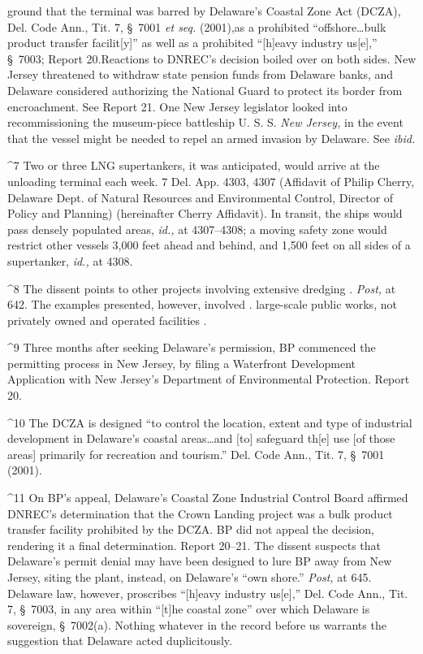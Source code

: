 {ground that the terminal was barred by Delaware's Coastal Zone Act
(DCZA), Del. Code Ann., Tit. 7, \S~7001 \emph{et seq.} (2001),\footnotemark[10] as
a prohibited ``offshore\dots bulk product transfer facilit[y]'' as
well as a prohibited ``[h]eavy industry us[e],'' \S~7003; Report
20.\footnotemark[11] Reactions to DNREC's decision boiled over on both sides.
New Jersey threatened to withdraw state pension funds from Delaware
banks, and Delaware considered authorizing the National Guard to protect
its border from encroachment. \newpage  See Report 21. One New Jersey
legislator looked into recommissioning the museum-piece battleship U. S.
S. \emph{New Jersey,} in the event that the vessel might be needed to repel
an armed invasion by Delaware. See \emph{ibid.}

^7 Two or three LNG supertankers, it was anticipated, would arrive at
the unloading terminal each week. 7 Del. App. 4303, 4307 (Affidavit
of Philip Cherry, Delaware Dept. of Natural Resources and Environmental
Control, Director of Policy and Planning) (hereinafter Cherry
Affidavit). In transit, the ships would pass densely populated areas,
\emph{id.,} at 4307--4308; a moving safety zone would restrict other
vessels 3,000 feet ahead and behind, and 1,500 feet on all sides of a
supertanker, \emph{id.,} at 4308.

^8 The dissent points to other projects involving extensive dredging   .
\emph{Post,} at 642. The examples presented, however, involved        .
large-scale public works, not privately owned and operated facilities  .

^9 Three months after seeking Delaware's permission, BP commenced the
permitting process in New Jersey, by filing a Waterfront Development
Application with New Jersey's Department of Environmental Protection.
Report 20.

^10 The DCZA is designed ``to control the location, extent and type
of industrial development in Delaware's coastal areas\dots and
[to] safeguard th[e] use [of those areas] primarily for recreation and
tourism.'' Del. Code Ann., Tit. 7, \S~7001 (2001).

^11 On BP's appeal, Delaware's Coastal Zone Industrial Control Board
affirmed DNREC's determination that the Crown Landing project was a
bulk product transfer facility prohibited by the DCZA. BP did not appeal
the decision, rendering it a final determination. Report 20--21.
The dissent suspects that Delaware's permit denial may have been
designed to lure BP away from New Jersey, siting the plant, instead,
on Delaware's ``own shore.'' \emph{Post,} at 645. Delaware law,
however, proscribes ``[h]eavy industry us[e],'' Del. Code Ann., Tit.
7, \S~7003, in any area within ``[t]he coastal zone'' over which
Delaware is sovereign, \S~7002(a). Nothing whatever in the record
before us warrants the suggestion that Delaware acted duplicitously.

}
